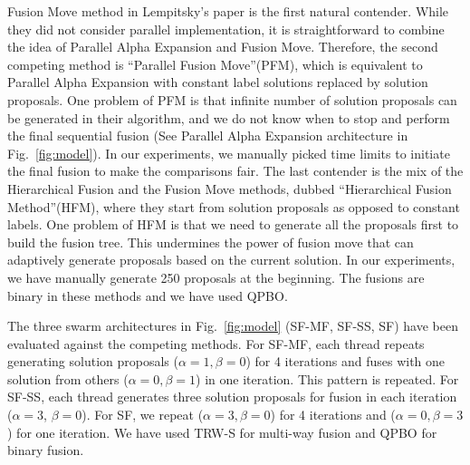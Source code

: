 \noindent Fusion Move method in Lempitsky's paper is the first natural
contender. While they did not consider parallel implementation, it is
straightforward to combine the idea of Parallel Alpha Expansion and
Fusion Move. Therefore, the second competing method is ``Parallel Fusion
Move''(PFM), which is equivalent to Parallel Alpha Expansion with constant
label solutions replaced by solution proposals.
%
One problem of PFM is that infinite number of solution proposals can be
generated in their algorithm, and we do not know when to stop and
perform the final sequential fusion (See Parallel Alpha Expansion
architecture in Fig.~\ref{fig:model}). In our experiments, we manually
picked time limits to initiate the final fusion to make the comparisons
fair.
%
The last contender is the mix of the Hierarchical Fusion and the Fusion
Move methods, dubbed ``Hierarchical Fusion Method''(HFM), where they
start from solution proposals as opposed to constant labels. One problem
of HFM is that we need to generate all the proposals first to build the
fusion tree. This undermines the power of fusion move that can
adaptively generate proposals based on the current solution. In our
experiments, we have manually generate 250 proposals at the
beginning.
The fusions are binary in these methods and we have used QPBO.


\noindent
The three swarm architectures in Fig.~\ref{fig:model} (SF-MF, SF-SS, SF)
have been evaluated against the competing methods. For SF-MF, each
thread repeats generating solution proposals ($\alpha=1, \beta=0$) for 4
iterations and fuses with one solution from others ($\alpha=0, \beta=1$)
in one iteration. This pattern is repeated. For SF-SS, each thread
generates three solution proposals for fusion in each iteration
($\alpha=3$, $\beta=0$). For SF, we repeat ($\alpha=3, \beta=0$) for 4
iterations and ($\alpha=0, \beta=3$) for one iteration.
We have used TRW-S for multi-way fusion and QPBO for binary fusion.
%
%
